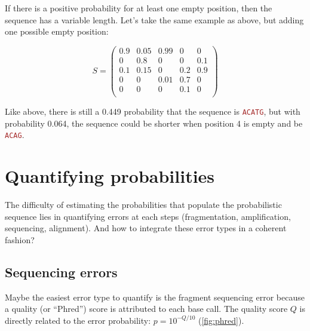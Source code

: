 \documentclass[12pt]{article}
\newcommand{\sq}[1]{\texttt{\textcolor{brown}{#1}}}
\begin{document}
If there is a positive probability for at least one empty position, then the sequence has a variable length. 
Let's take the same example as above, but adding one possible empty position:

$$
S = 
\begin{pmatrix}
0.9 & 0.05   & 0.99 & 0 & 0\\
0   & 0.8 & 0 & 0 & 0.1\\
0.1 & 0.15 & 0 & 0.2 & 0.9\\
0 & 0 & 0.01 & 0.7 & 0\\
0 & 0 & 0 & 0.1 & 0\\
\end{pmatrix}
$$

Like above, there is still a 0.449 probability that the sequence is \sq{ACATG}, but with probability 0.064, the sequence could be shorter when position 4 is empty and be \sq{ACAG}.



\section{Quantifying probabilities}

The difficulty of estimating the probabilities that populate the probabilistic sequence lies in quantifying errors at each steps (fragmentation, amplification, sequencing, alignment). And how to integrate these error types in a coherent fashion?


\subsection{Sequencing errors}

Maybe the easiest error type to quantify is the fragment sequencing error because a quality (or ``Phred'') score is attributed to each base call. The quality score $Q$ is directly related to the error probability: $p = 10^{-Q/10}$ (\autoref{fig:phred}). 
\end{document}
